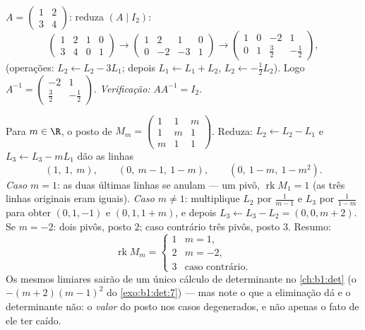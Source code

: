 \begin{example}\label{ex:b1:matrices:inverse}
$A = \begin{pmatrix} 1 & 2 \\ 3 & 4 \end{pmatrix}$: reduza $(A \mid
I_2)$:
\[
\begin{pmatrix} 1 & 2 & 1 & 0\\ 3 & 4 & 0 & 1 \end{pmatrix}
\to
\begin{pmatrix} 1 & 2 & 1 & 0\\ 0 & -2 & -3 & 1 \end{pmatrix}
\to
\begin{pmatrix} 1 & 0 & -2 & 1\\ 0 & 1 & \tfrac32 & -\tfrac12
\end{pmatrix},
\]
(operações: $L_2 \leftarrow L_2 - 3L_1$; depois $L_1 \leftarrow L_1
+ L_2$, $L_2 \leftarrow -\frac12 L_2$). Logo $A^{-1} =
\begin{pmatrix} -2 & 1 \\ \tfrac32 & -\tfrac12\end{pmatrix}$.
\emph{Verificação:} $AA^{-1} = I_2$.
\end{example}

\begin{example}
\label{ex:b1:matrices:rankparameter}
Para $m \in \R$, o posto de $M_m = \begin{pmatrix} 1 & 1 & m\\ 1 & m & 1\\ m & 1 &
1\end{pmatrix}$. Reduza: $L_2 \leftarrow L_2 - L_1$ e $L_3
\leftarrow L_3 - mL_1$ dão as linhas
\[
(1,\ 1,\ m), \qquad (0,\ m - 1,\ 1 - m), \qquad
(0,\ 1 - m,\ 1 - m^2).
\]
\emph{Caso $m = 1$}: as duas últimas linhas se anulam --- um pivô,
$\operatorname{rk} M_1 = 1$ (as três linhas originais eram iguais). \emph{Caso $m \neq 1$}:
multiplique $L_2$ por $\frac1{m-1}$ e $L_3$ por $\frac1{1-m}$ para obter $(0, 1, -1)$ e
$(0, 1, 1 + m)$, e depois $L_3 \leftarrow L_3 - L_2 = (0, 0, m + 2)$. Se $m = -2$: dois pivôs, posto $2$; caso
contrário três pivôs, posto $3$. Resumo:
\[
\operatorname{rk} M_m =
\begin{cases}
1 & m = 1,\\
2 & m = -2,\\
3 & \text{caso contrário}.
\end{cases}
\]
Os mesmos limiares sairão de um único cálculo de determinante no
\cref{ch:b1:det} (o  $-(m+2)(m-1)^2$ do \cref{exo:b1:det:7}) --- mas note o que a eliminação
dá e o determinante não: o \emph{valor} do posto nos casos
degenerados, e não apenas o fato de ele ter caído.
\end{example}

